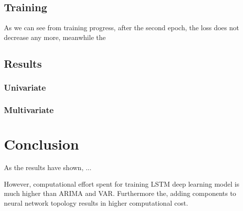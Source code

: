 \documentclass[11pt]{article}
\begin{document}
\subsection{Training}
As we can see from training progress, after the second epoch, the loss does not
decrease any more, meanwhile the 
\subsection{Results}

\subsubsection{Univariate}

\subsubsection{Multivariate}


\section{Conclusion}
As the results have shown, ...

However, computational effort spent for training LSTM deep learning model is
much higher than ARIMA and VAR. Furthermore the, adding components to neural network
topology results in higher computational cost. 

\pagebreak


\end{document}
